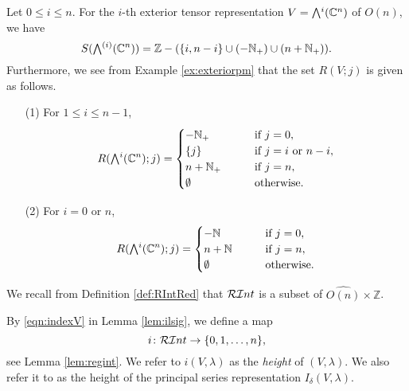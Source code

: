 \begin{example}
\label{ex:isig}
Let $0 \le i \le n$.  
For the $i$-th exterior tensor representation
 $V=\Exterior^i({\mathbb{C}}^n)$ of $O(n)$, 
 we have
\[
   S(\Exterior^{(i)}({\mathbb{C}}^n))
   =
   {\mathbb{Z}} 
   \setminus 
   (\{i,n-i\}\cup (-{\mathbb{N}}_+) \cup (n+{\mathbb{N}}_+)).  
\]
Furthermore, 
 we see from Example \ref{ex:exteriorpm}
 that the set $R(V;j)$ is given as follows.  
\begin{enumerate}
\item[{\rm{(1)}}]
For $1 \le i \le n-1$, 
\[
  R(\Exterior^i({\mathbb{C}}^n);j)
  =
  \begin{cases}
  -{\mathbb{N}}_+
  \qquad
  &{\text{if $j=0$}}, 
\\
  \{j\}
  \qquad
  &{\text{if $j=i$ or $n-i$}}, 
\\
  n+{\mathbb{N}}_+
  \qquad
  &{\text{if $j=n$}}, 
\\
  \emptyset
  \qquad
  &{\text{otherwise}}.  
  \end{cases}
\]
\item[{\rm{(2)}}]
For $i =0$ or $n$, 
\[
  R(\Exterior^i({\mathbb{C}}^n);j)
  =
  \begin{cases}
  -{\mathbb{N}}
  \qquad
  &{\text{if $j=0$}}, 
\\
  n+{\mathbb{N}}
  \qquad
  &{\text{if $j=n$}}, 
\\
  \emptyset
  \qquad
  &{\text{otherwise}}.  
  \end{cases}
\]
\end{enumerate}

\end{example}



We recall from Definition \ref{def:RIntRed}
 that ${\mathcal{RI}}nt$ is a subset of $\widehat {O(n)} \times {\mathbb{Z}}$.  
\begin{definition}
\label{def:iVlmd}
By \eqref{eqn:indexV} in Lemma \ref{lem:ilsig}, 
 we define a map
\[
  i \colon {\mathcal{RI}}nt \to \{0,1,\ldots,n\}, 
\]
see Lemma \ref{lem:regint}.  
We refer to 
$i(V,\lambda)$ as the {\it{height}} of $(V,\lambda)$.  
We also refer it to as the 
height of the principal series representation
 $I_{\delta}(V,\lambda)$.  
\end{definition}

